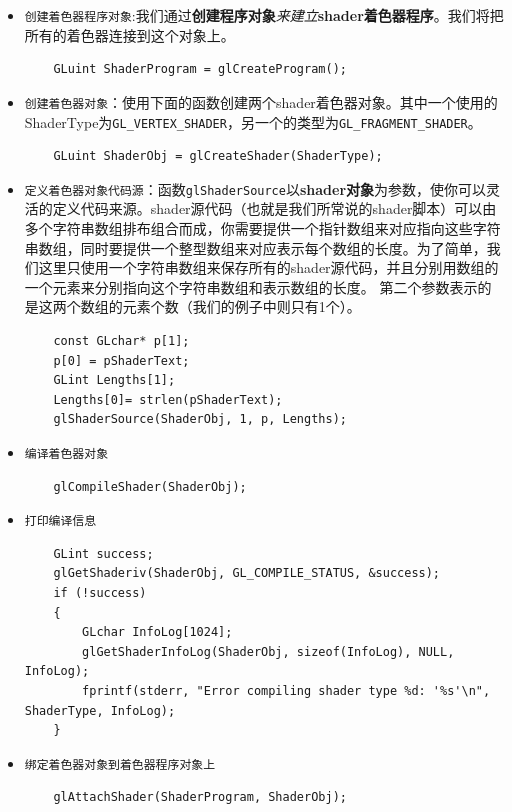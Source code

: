\documentclass[UTF8,a4paper,8pt]{ctexbook}
\begin{document}
			\begin{itemize}
			\item \verb|创建着色器程序对象|:我们通过\textbf{创建程序对象}\textit{来建立}\textbf{shader着色器程序}。我们将把所有的着色器连接到这个对象上。
			\begin{lstlisting}
	GLuint ShaderProgram = glCreateProgram();
			\end{lstlisting}
			
			\item \verb|创建着色器对象|：使用下面的函数创建两个shader着色器对象。其中一个使用的ShaderType为\verb|GL_VERTEX_SHADER|，另一个的类型为\verb|GL_FRAGMENT_SHADER|。
			\begin{lstlisting}
	GLuint ShaderObj = glCreateShader(ShaderType); 
			\end{lstlisting}
			
			\item \verb|定义着色器对象代码源|：函数\verb|glShaderSource|以\textbf{shader对象}为参数，使你可以灵活的定义代码来源。shader源代码（也就是我们所常说的shader脚本）可以由多个字符串数组排布组合而成，你需要提供一个指针数组来对应指向这些字符串数组，同时要提供一个整型数组来对应表示每个数组的长度。为了简单，我们这里只使用一个字符串数组来保存所有的shader源代码，并且分别用数组的一个元素来分别指向这个字符串数组和表示数组的长度。 
			第二个参数表示的是这两个数组的元素个数（我们的例子中则只有1个）。
			\begin{lstlisting}
	const GLchar* p[1]; 
	p[0] = pShaderText; 
	GLint Lengths[1]; 
	Lengths[0]= strlen(pShaderText); 
	glShaderSource(ShaderObj, 1, p, Lengths);
			\end{lstlisting}
			
			\item \verb|编译着色器对象|
			\begin{lstlisting}
	glCompileShader(ShaderObj); 
			\end{lstlisting}	
			
			\item \verb|打印编译信息|
			\begin{lstlisting}
	GLint success; 
	glGetShaderiv(ShaderObj, GL_COMPILE_STATUS, &success); 
	if (!success) 
	{ 
		GLchar InfoLog[1024]; 
		glGetShaderInfoLog(ShaderObj, sizeof(InfoLog), NULL, InfoLog); 
		fprintf(stderr, "Error compiling shader type %d: '%s'\n", ShaderType, InfoLog); 
	} 
			\end{lstlisting}
		
			\item \verb|绑定着色器对象到着色器程序对象上|
			\begin{lstlisting}
	glAttachShader(ShaderProgram, ShaderObj);
			\end{lstlisting}
			

\end{itemize}
\end{document}
